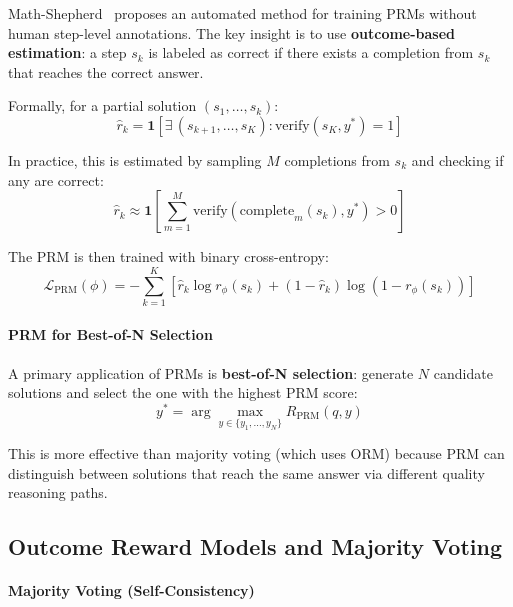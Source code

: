 Math-Shepherd~\cite{wang2024mathshepherd} proposes an automated method for training PRMs without human step-level annotations. The key insight is to use \textbf{outcome-based estimation}: a step $s_k$ is labeled as correct if there exists a completion from $s_k$ that reaches the correct answer.

Formally, for a partial solution $(s_1, \ldots, s_k)$: 
\begin{equation}
    \hat{r}_k = \mathbf{1}\!\left[\exists\, (s_{k+1}, \ldots, s_K) : \text{verify}(s_K, y^*) = 1\right]
\end{equation}

In practice, this is estimated by sampling $M$ completions from $s_k$ and checking if any are correct: 
\begin{equation}
    \hat{r}_k \approx \mathbf{1}\!\left[\sum_{m=1}^{M} \text{verify}(\text{complete}_m(s_k), y^*) > 0\right]
\end{equation}

The PRM is then trained with binary cross-entropy: 
\begin{equation}
    \mathcal{L}_{\text{PRM}}(\phi) = -\sum_{k=1}^{K} \left[ \hat{r}_k \log r_\phi(s_k) + (1-\hat{r}_k) \log(1 - r_\phi(s_k)) \right]
\end{equation}

\paragraph{PRM for Best-of-N Selection}
\label{prm-for-best-of-n-selection}

A primary application of PRMs is \textbf{best-of-N selection}: generate $N$ candidate solutions and select the one with the highest PRM score: 
\begin{equation}
    y^* = \arg\max_{y \in \{y_1, \ldots, y_N\}} R_{\text{PRM}}(q, y)
\end{equation}

This is more effective than majority voting (which uses ORM) because PRM can distinguish between solutions that reach the same answer via different quality reasoning paths.

\subsection{Outcome Reward Models and Majority Voting}
\label{outcome-reward-models-and-majority-voting}

\paragraph{Majority Voting (Self-Consistency)}
\label{majority-voting-self-consistency}

